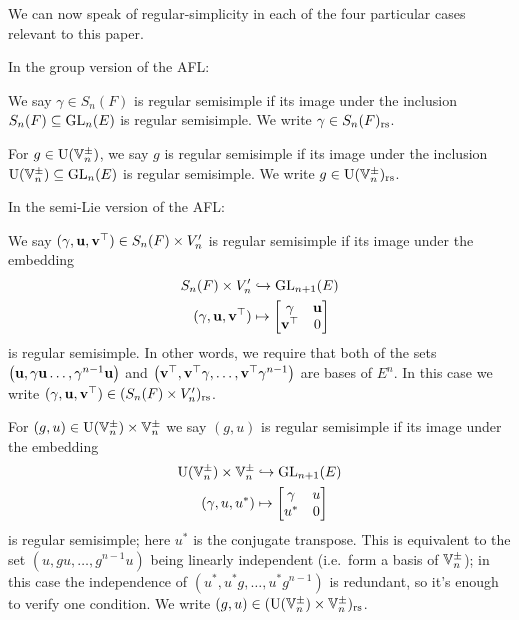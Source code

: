 We can now speak of regular-simplicity in each of the four
particular cases relevant to this paper.
\begin{definition}
  In the group version of the AFL:
  \begin{itemize}
    \ii We say $\gamma \in S_n(F)$ is regular semisimple
    if its image under the inclusion $S_n(F) \subseteq \operatorname{GL}_n(E)$ is regular semisimple.
    We write $\gamma \in S_n(F)_{\mathrm{rs}}$.

    \ii For $g \in \operatorname{U}(\mathbb V_n^\pm)$,
    we say $g$ is regular semisimple
    if its image under the inclusion $\operatorname{U}(\mathbb V_n^\pm) \subseteq \operatorname{GL}_n(E)$ is regular semisimple.
    We write $g \in \operatorname{U}(\mathbb V_n^\pm)_{\mathrm{rs}}$.
  \end{itemize}
  In the semi-Lie version of the AFL:
  \begin{itemize}
    \ii We say $(\gamma, \mathbf u, \mathbf v^\top) \in S_n(F) \times V_n'$
    is regular semisimple if its image under the embedding
    \begin{equation}
      \begin{aligned}
        S_n(F) \times V_n' &\hookrightarrow \operatorname{GL}_{n+1}(E) \\
        (\gamma, \mathbf u, \mathbf v^\top) &\mapsto \begin{bmatrix} \gamma & \mathbf u \\ \mathbf v^\top & 0 \end{bmatrix}
      \end{aligned}
      \label{eq:embed_FJ_analytic}
    \end{equation}
    is regular semisimple.
    In other words, we require that
    both of the sets
    $\left( \mathbf u, \gamma \mathbf u \dots, \gamma^{n-1}\mathbf u \right)$
    and
    $\left( \mathbf v^\top, \mathbf v^\top \gamma, \dots, \mathbf v^\top \gamma^{n-1} \right)$
    are bases of $E^n$.
    In this case we write $(\gamma, \mathbf u, \mathbf v^\top) \in (S_n(F) \times V_n')_{\mathrm{rs}}$.

    \ii For $(g,u) \in \operatorname{U}(\mathbb V_n^\pm) \times \mathbb V_n^\pm$ we say $(g, u)$
    is regular semisimple if its image under the embedding
    \begin{equation}
      \begin{aligned}
        \operatorname{U}(\mathbb V_n^\pm) \times \mathbb V_n^\pm &\hookrightarrow \operatorname{GL}_{n+1}(E) \\
        (\gamma, u, u^\ast) &\mapsto \begin{bmatrix} \gamma & u \\ u^\ast & 0 \end{bmatrix}
      \end{aligned}
      \label{eq:embed_FJ_geometric}
    \end{equation}
    is regular semisimple; here $u^\ast$ is the conjugate transpose.
    This is equivalent to the set $\left(  u, gu, \dots, g^{n-1}u \right)$
    being linearly independent (i.e.\ form a basis of $\mathbb V_n^\pm$);
    in this case the independence of $\left( u^\ast, u^\ast g, \dots, u^\ast g^{n-1} \right)$
    is redundant, so it's enough to verify one condition.
    We write $(g,u) \in (\operatorname{U}(\mathbb V_n^\pm) \times \mathbb V_n^\pm)_{\mathrm{rs}}$.
  \end{itemize}
  \label{def:regular}
\end{definition}

